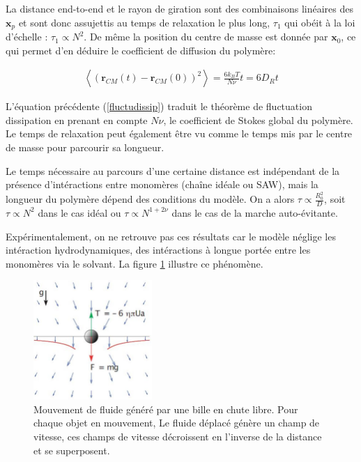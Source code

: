 \documentclass[a4paper,11pt]{article}
\begin{document}
La distance end-to-end et le rayon de giration sont des combinaisons linéaires des $\textbf{x}_p$ et sont donc assujettis  au temps de relaxation le plus long, $\tau_1$ qui obéit à la loi d'échelle : $\tau_1 \propto N^2$. De même la position du centre de masse est donnée par $\textbf{x}_0$, ce qui permet d'en déduire le coefficient de diffusion du polymère:


\begin{eqnarray}
\left<(\textbf{r}_{CM}(t)-\textbf{r}_{CM}(0))^2\right>=\frac{6 k_B T}{N \nu} t = 6 D_R t
\label{fluctudissip}
\end{eqnarray}




L'équation précédente (\ref{fluctudissip}) traduit le théorème de fluctuation dissipation  en prenant en compte $N \nu$, le coefficient de Stokes global du polymère. Le temps de relaxation peut également être vu comme le temps mis par le centre de masse pour parcourir sa longueur.

 Le temps nécessaire au parcours d'une certaine distance est indépendant de la présence d'intéractions entre monomères (chaîne idéale ou SAW), mais la longueur du polymère dépend des conditions du modèle. On a alors $\tau \propto \frac{R_0^2}{D}$, soit $\tau \propto N^2 $ dans le cas idéal ou $\tau \propto N^{1+2\nu} $ dans le cas de la marche auto-évitante. 

Expérimentalement, on ne retrouve pas ces résultats car le modèle néglige les intéraction hydrodynamiques, des intéractions à longue portée entre les monomères via le solvant. La figure \ref{hydrodyninterac} illustre ce phénomène.


\begin{figure}[H]
\begin{center}
\includegraphics[width=0.4\textwidth]{hydrodyninterac.jpg} 

\caption{Mouvement de fluide généré par une bille en chute libre. Pour chaque objet en mouvement, Le fluide déplacé génère un champ de vitesse, ces champs de vitesse décroissent en l'inverse de la distance et se superposent.}
\label{hydrodyninterac}
\end{center}
\end{figure}
\end{document}
